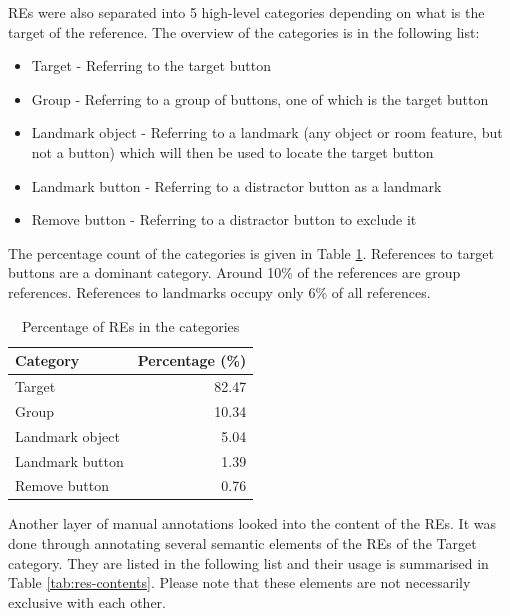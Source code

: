 REs were also separated into 5 high-level categories depending on what is the target of the reference. The  overview of the categories is in the following list:

\begin{itemize}
\item
Target - Referring to the target button
\item
Group - Referring to a group of buttons, one of which is the target button
\item
Landmark object - Referring to a landmark (any object or room feature, but not a button) which will then be used to locate the target button
\item
Landmark button - Referring to a distractor button as a landmark
\item
Remove button -  Referring to a distractor button to exclude it
\end{itemize}

The percentage count of the categories is given in Table \ref{tab:res-groups}. References to target buttons are a dominant category. Around 10\% of the references are group references. References to landmarks occupy only 6\% of all references.

\begin{table}[!htbp]
 \centering
\begin{tabular}{lr}
\toprule
Category  & Percentage (\%)  \\
\midrule
Target   		& 82.47\\
Group 			& 10.34\\
Landmark object 	& 5.04\\
Landmark button	& 1.39\\
Remove button 	& 0.76\\
\bottomrule
\end{tabular}
\caption{Percentage of REs in the categories}
\label{tab:res-groups}
\end{table} 

Another layer of manual annotations looked into the content of the REs. It was done through annotating several semantic elements of the REs of the Target category. They are listed in the following list and their usage is summarised in Table \ref{tab:res-contents}. Please note that these elements are not necessarily exclusive with each other.

